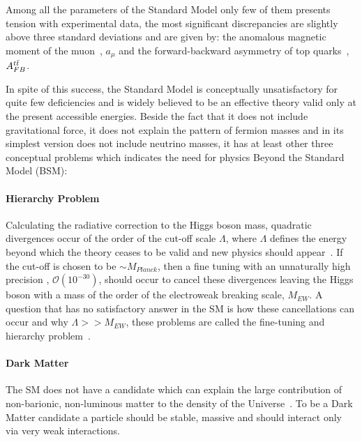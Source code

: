 Among all the parameters of the Standard Model only few of them presents tension with experimental data, 
the most significant discrepancies are slightly above three standard deviations and are given by: the anomalous magnetic moment 
of the muon~\cite{gminus2}, $a_{\mu}$  and the forward-backward asymmetry of top quarks~\cite{FBasymmetry}, $A_{FB}^{t\bar{t}}$.   


In spite of this success, the Standard Model is conceptually unsatisfactory for quite few deficiencies and is
widely believed to be an effective theory valid only at the present accessible energies. Beside the fact that 
it does not  include  gravitational force, it does not explain the pattern of fermion masses and in its simplest 
version does not include neutrino masses, it has at least other three conceptual problems which indicates the need 
for physics Beyond the Standard Model (BSM):
\paragraph{Hierarchy Problem} Calculating the radiative correction to the Higgs boson mass, quadratic divergences occur of the order  
	of the cut-off scale $\Lambda$, where  $\Lambda$ defines  the energy
	beyond which the theory ceases to be valid and new physics should appear~\cite{Lambda}. If the cut-off is chosen 
	to be $\sim M_{Planck}$, then a fine tuning  with an unnaturally high precision , $\mathcal{O}(10^{-30})$, should occur to cancel these divergences 
	leaving the Higgs boson with a mass of the order of the electroweak breaking scale, $M_{EW}$.
	A question that has no satisfactory answer in the SM is how these cancellations can occur and why $\Lambda >> M_{EW}$, these problems are
	called the fine-tuning and hierarchy problem~\cite{Hierarchy1,Hierarchy2,Hierarchy3}.

\paragraph{Dark Matter}   The SM does not have a candidate which can explain the large contribution 
	of non-barionic, non-luminous matter to the density of the Universe~\cite{darkmatter1,darkmatter2,darkmatter3}. To be a Dark Matter candidate a particle should be
	stable, massive and should interact only via very weak interactions. 

